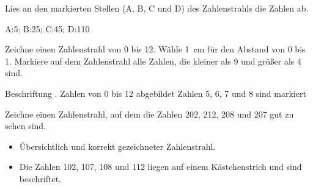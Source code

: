 
\begin{Aufgabe}{2}
	Lies an den markierten Stellen (A, B, C und D) des Zahlenstrahls die Zahlen ab.

\end{Aufgabe}

\begin{Loesung}
	A:\@5; \HalberPunkt{}\hspace{.3cm} B:\@25; \HalberPunkt{}\hspace{.3cm} C:45; \HalberPunkt{}\hspace{.3cm} D:\@110 \HalberPunkt{}
\end{Loesung}

\begin{Aufgabe}{2}
	\begin{tasks}
		\task Zeichne einen Zahlenstrahl von 0 bis 12. Wähle \SI{1}{\centi\meter} für den Abstand von 0 bis 1.
		\task Markiere auf dem Zahlenstrahl alle Zahlen, die kleiner als 9 und größer als 4 sind.
	\end{tasks}
\end{Aufgabe}

\begin{Loesung}
	\begin{tasks}
		\task Beschriftung \HalberPunkt{}. Zahlen von 0 bis 12 abgebildet \HalberPunkt{}
		\task Zahlen 5, 6, 7 und 8 sind markiert \Punkt{}
	\end{tasks}
\end{Loesung}

\begin{Aufgabe}{2}
	Zeichne einen Zahlenstrahl, auf dem die Zahlen 202, 212, 208 und 207 gut zu sehen sind.
\end{Aufgabe}

\begin{Loesung}
	\begin{itemize}
		\item[\Punkt{}] Übersichtlich und korrekt gezeichneter Zahlenstrahl.
		\item[\Punkt{}] Die Zahlen 102, 107, 108 und 112 liegen auf einem Kästchenstrich und sind beschriftet.
	\end{itemize}
\end{Loesung}
